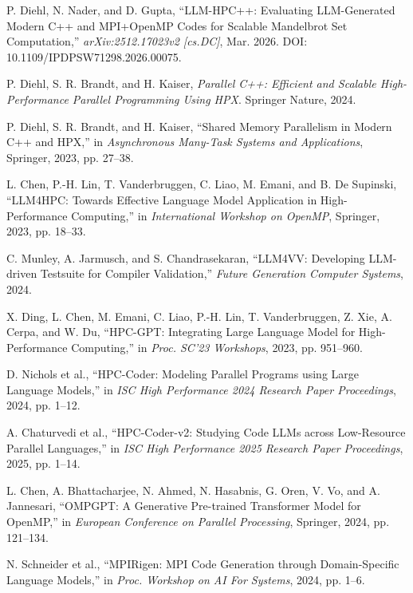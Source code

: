 P. Diehl, N. Nader, and D. Gupta, ``LLM-HPC++: Evaluating LLM-Generated Modern
C++ and MPI+OpenMP Codes for Scalable Mandelbrot Set Computation,''
\emph{arXiv:2512.17023v2 [cs.DC]}, Mar. 2026.
DOI: 10.1109/IPDPSW71298.2026.00075.

P. Diehl, S. R. Brandt, and H. Kaiser, \emph{Parallel C++: Efficient and Scalable
High-Performance Parallel Programming Using HPX}. Springer Nature, 2024.

P. Diehl, S. R. Brandt, and H. Kaiser, ``Shared Memory Parallelism in Modern C++
and HPX,'' in \emph{Asynchronous Many-Task Systems and Applications}, Springer,
2023, pp. 27--38.

L. Chen, P.-H. Lin, T. Vanderbruggen, C. Liao, M. Emani, and B. De Supinski,
``LLM4HPC: Towards Effective Language Model Application in High-Performance
Computing,'' in \emph{International Workshop on OpenMP}, Springer, 2023,
pp. 18--33.

C. Munley, A. Jarmusch, and S. Chandrasekaran, ``LLM4VV: Developing LLM-driven
Testsuite for Compiler Validation,'' \emph{Future Generation Computer Systems},
2024.

X. Ding, L. Chen, M. Emani, C. Liao, P.-H. Lin, T. Vanderbruggen, Z. Xie, A. Cerpa,
and W. Du, ``HPC-GPT: Integrating Large Language Model for High-Performance
Computing,'' in \emph{Proc. SC'23 Workshops}, 2023, pp. 951--960.

D. Nichols et al., ``HPC-Coder: Modeling Parallel Programs using Large Language
Models,'' in \emph{ISC High Performance 2024 Research Paper Proceedings}, 2024,
pp. 1--12.

A. Chaturvedi et al., ``HPC-Coder-v2: Studying Code LLMs across Low-Resource
Parallel Languages,'' in \emph{ISC High Performance 2025 Research Paper
Proceedings}, 2025, pp. 1--14.

L. Chen, A. Bhattacharjee, N. Ahmed, N. Hasabnis, G. Oren, V. Vo, and A. Jannesari,
``OMPGPT: A Generative Pre-trained Transformer Model for OpenMP,'' in
\emph{European Conference on Parallel Processing}, Springer, 2024, pp. 121--134.

N. Schneider et al., ``MPIRigen: MPI Code Generation through Domain-Specific
Language Models,'' in \emph{Proc. Workshop on AI For Systems}, 2024, pp. 1--6.

